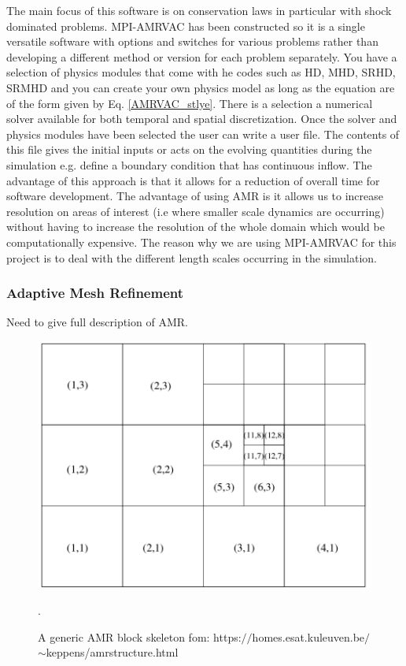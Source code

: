 \documentclass[12pt,a4paper,twoside]{article}
\begin{document}
The main focus of this software is on conservation laws in particular with shock dominated problems. MPI-AMRVAC has been constructed so it is a single versatile software with options and switches for various problems rather than developing a different method or version for each problem separately. You have a selection of physics modules that come with he codes such as HD, MHD, SRHD, SRMHD and you can create your own physics model as long as the equation are of the form given by Eq. \eqref{AMRVAC_stlye}. There is a selection a numerical solver available for both temporal and spatial discretization. Once the solver and physics modules have been selected the user can write a user file. The contents of this file gives the initial inputs or acts on the evolving quantities during the simulation e.g. define a boundary condition that has continuous inflow. The advantage of this approach is that it allows for a reduction of overall time for software development. The advantage of using AMR is it allows us to increase resolution on areas of interest (i.e where smaller scale dynamics are occurring) without having to increase the resolution of the whole domain which would be computationally expensive. The reason why we are using MPI-AMRVAC for this project is to deal with the different length scales occurring in the simulation.
\subsubsection{Adaptive Mesh Refinement}
Need to give full description of AMR. 
\begin{figure}
\centering
\includegraphics[width = \textwidth]{amrpng.png}
\caption{A generic AMR block skeleton fom: https:$//$homes.esat.kuleuven.be$/$ $\sim$keppens/amrstructure.html}.
\label{amr_scheme}
\end{figure}   
\end{document}
